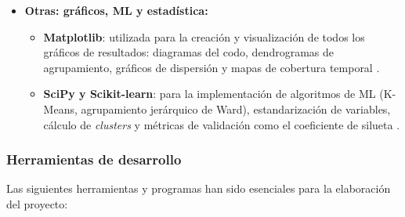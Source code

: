 \begin{itemize}
	\begin{itemize}
		\item \textbf{openpyxl}: para la lectura de archivos Excel (\texttt{.xlsx}) para los conjuntos de datos que se publican en ese formato \citep{Openpyxl2026}.
		\item \textbf{pyarrow}: para la lectura y escritura eficiente en formato \texttt{Parquet}, que se utiliza como formato de salida de la capa \textit{silver} junto con CSV, para intentar mejorar el rendimiento en entornos cloud \citep{PyArrow2026}.
	\end{itemize}
	\item \textbf{Otras: gráficos, ML y estadística:}
	\begin{itemize}
		\item \textbf{Matplotlib}: utilizada para la creación y visualización de todos los gráficos de resultados: diagramas del codo, dendrogramas de agrupamiento, gráficos de dispersión y mapas de cobertura temporal \citep{Matplotlib2026}.
		\item \textbf{SciPy y Scikit-learn}: para la implementación de algoritmos de ML (K-Means, agrupamiento jerárquico de Ward), estandarización de variables, cálculo de \textit{clusters} y métricas de validación como el coeficiente de silueta \citep{SciPy2026, scikit2026}.
	\end{itemize}	
\end{itemize}

\subsubsection{Herramientas de desarrollo}

Las siguientes herramientas y programas han sido esenciales para la elaboración del proyecto:

